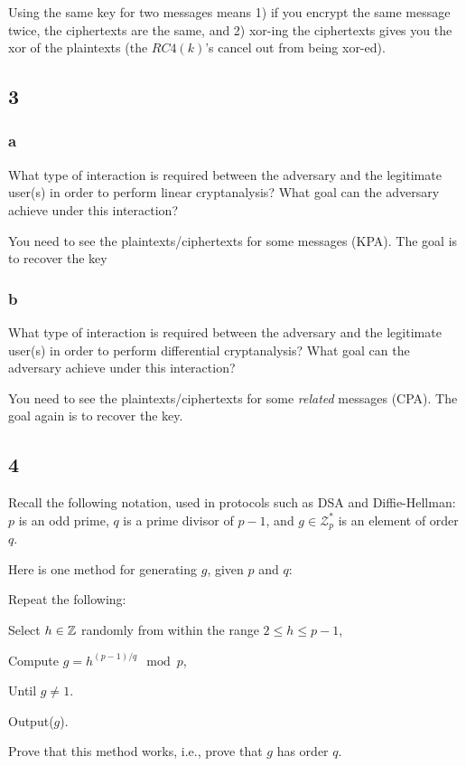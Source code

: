 \documentclass[11pt]{article}
\begin{document}
Using the same key for two messages means 1) if you encrypt the same message twice, the ciphertexts are the same, and 2) xor-ing the ciphertexts gives you the xor of the plaintexts (the $RC4(k)$'s cancel out from being xor-ed).

\subsection{3}

\subsubsection{a} What type of interaction is required between the adversary and the legitimate user(s) in order to perform linear cryptanalysis? What goal can the adversary achieve under this interaction?

You need to see the plaintexts/ciphertexts for some messages (KPA). The goal is to recover the key

\subsubsection{b} What type of interaction is required between the adversary and the legitimate user(s) in order to perform diﬀerential cryptanalysis? What goal can the adversary achieve under this interaction?

You need to see the plaintexts/ciphertexts for some \textit{related} messages (CPA). The goal again is to recover the key.

\subsection{4}

Recall the following notation, used in protocols such as DSA and Diﬃe-Hellman: $p$ is an odd prime, $q$ is a prime divisor of $p - 1$, and $g \in \mathcal{Z}^*_p$ is an element of order $q$.

Here is one method for generating $g$, given $p$ and $q$:

Repeat the following:

Select $h \in \mathbb{Z}$ randomly from within the range $2 \leq h \leq p - 1$,

Compute $g = h^{(p-1)/q} \mod p$,

Until $g \neq 1$.

Output($g$).

Prove that this method works, i.e., prove that $g$ has order $q$.
\end{document}
